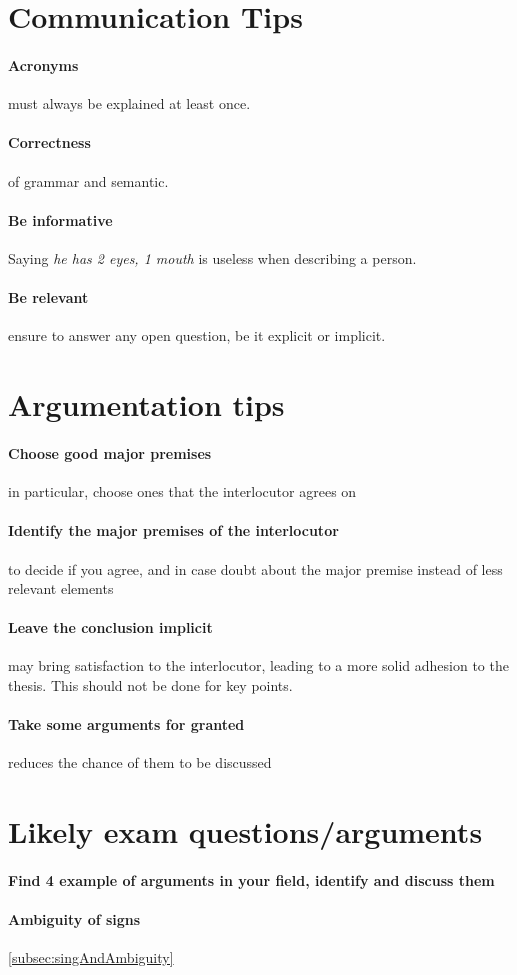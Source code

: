 \documentclass{article}
\begin{document}
\appendix
\section{Communication Tips}
\paragraph{Acronyms} must always be explained at least once.
\paragraph{Correctness} of grammar and semantic.
\paragraph{Be informative} Saying \textit{he has 2 eyes, 1 mouth} is useless when describing a person.
\paragraph{Be relevant} ensure to answer any open question, be it explicit or implicit.
\section{Argumentation tips}
\paragraph{Choose good major premises} in particular, choose ones that the interlocutor agrees on
\paragraph{Identify the major premises of the interlocutor} to decide if you agree, and in case doubt about the major premise instead of less relevant elements
\paragraph{Leave the conclusion implicit} may bring satisfaction to the interlocutor, leading to a more solid adhesion to the thesis. This should not be done for key points.
\paragraph{Take some arguments for granted} reduces the chance of them to be discussed
\section{Likely exam questions/arguments}
\paragraph{Find 4 example of arguments in your field, identify and discuss them}
\paragraph{Ambiguity of signs} \ref{subsec:singAndAmbiguity}
\end{document}
